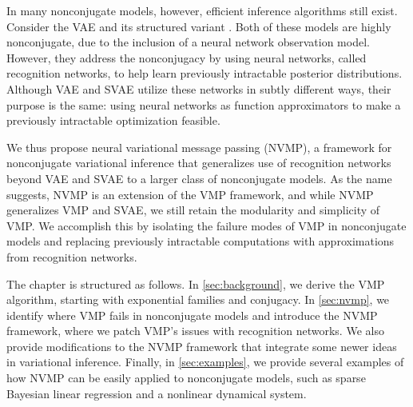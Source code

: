 In many nonconjugate models,
however, efficient inference algorithms still exist.
Consider the VAE
and its structured variant \citep[SVAE; ][]{Johnson2016}.
Both of these models
are highly nonconjugate, due to the inclusion
of a neural network observation model.
However, they address the nonconjugacy
by using neural networks, called recognition networks,
to help learn previously intractable posterior distributions.
Although VAE and SVAE utilize these networks
in subtly different ways, their purpose is the same: using
neural networks as function approximators
to make a previously intractable optimization feasible.

We thus propose neural variational message passing (NVMP),
a framework for nonconjugate variational inference
that generalizes use of recognition networks beyond
VAE and SVAE to a larger class
of nonconjugate models. 
As the name suggests,
NVMP is an extension of the
VMP framework, and while NVMP
generalizes VMP and SVAE, 
we still retain the modularity and
simplicity of VMP. 
We accomplish this by 
isolating the failure modes of VMP in nonconjugate models
and replacing previously intractable
computations with approximations
from recognition networks.

The chapter is structured as follows. In \autoref{sec:background},
we derive the VMP algorithm, starting
with exponential families and conjugacy.
In \autoref{sec:nvmp},
we identify where VMP fails in nonconjugate
models and introduce the NVMP framework,
where we patch VMP's issues
with recognition networks.
We also provide
modifications to the NVMP framework
that integrate some newer ideas
in variational inference. 
Finally, in \autoref{sec:examples},
we provide several examples of how NVMP can
be easily applied to nonconjugate models, such
as sparse Bayesian linear regression
and a nonlinear dynamical system.


